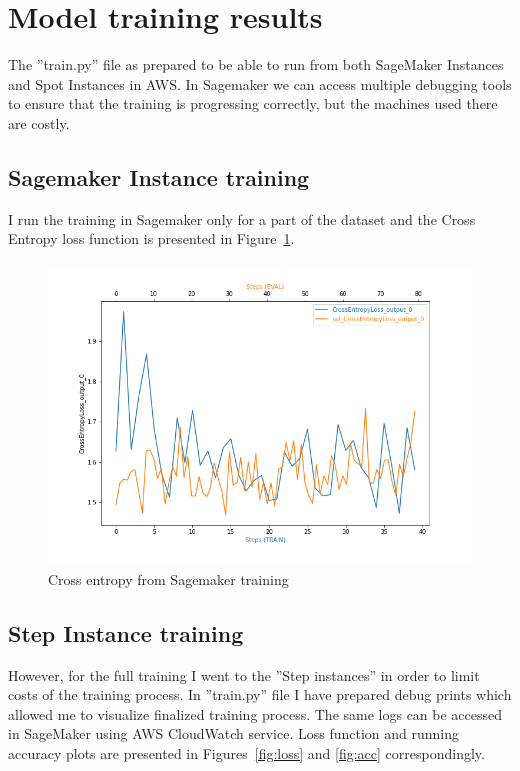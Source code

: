 \documentclass{article}
\begin{document}
\section{Model training results}
The ''train.py'' file as prepared to be able to run from both SageMaker Instances and Spot Instances in AWS. In Sagemaker we can access multiple debugging tools to ensure that the training is progressing correctly, but the machines used there are costly. 

\subsection{Sagemaker Instance training}
I run the training in Sagemaker only for a part of the dataset and the Cross Entropy loss function is presented in Figure~\ref{fig:training_sage}.

\begin{figure}[ht]
	\centering
	\includegraphics[height=80mm]{../project/training_debug_values.png}
	\caption{Cross entropy from Sagemaker training}
	\label{fig:training_sage}
\end{figure}

\subsection{Step Instance training}
However, for the full training I went to the ''Step instances'' in order to limit costs of the training process. In ''train.py'' file I have prepared debug prints which allowed me to visualize finalized training process. The same logs can be accessed in SageMaker using AWS CloudWatch service. Loss function and running accuracy plots are presented in Figures~\ref{fig:loss} and \ref{fig:acc} correspondingly.
\end{document}

